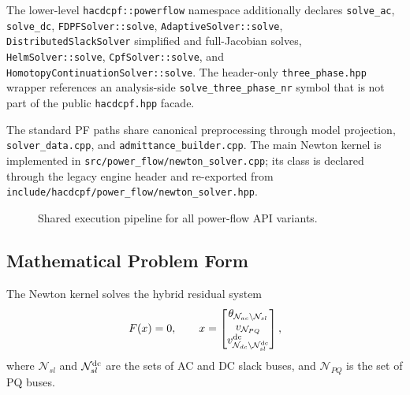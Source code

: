 The lower-level \texttt{hacdcpf::powerflow} namespace additionally declares
\texttt{solve\_ac}, \texttt{solve\_dc}, \texttt{FDPFSolver::solve},
\texttt{AdaptiveSolver::solve}, \texttt{DistributedSlackSolver} simplified and
full-Jacobian solves, \texttt{HelmSolver::solve}, \texttt{CpfSolver::solve},
and \texttt{HomotopyContinuationSolver::solve}.  The header-only
\texttt{three\_phase.hpp} wrapper references an analysis-side
\texttt{solve\_three\_phase\_nr} symbol that is not part of the public
\texttt{hacdcpf.hpp} facade.

The standard PF paths share canonical preprocessing through model projection,
\texttt{solver\_data.cpp}, and \texttt{admittance\_builder.cpp}.  The main Newton
kernel is implemented in \texttt{src/power\_flow/newton\_solver.cpp}; its class is
declared through the legacy engine header and re-exported from
\texttt{include/hacdcpf/power\_flow/newton\_solver.hpp}.

\begin{figure}[H]
\centering
{}
\caption{Shared execution pipeline for all power-flow API variants.}
\label{fig:pf-pipeline}
\end{figure}

\subsection{Mathematical Problem Form}

The Newton kernel solves the hybrid residual system
\begin{align}
F(x) = 0,
\qquad
x =
\begin{bmatrix}
\theta_{\mathcal{N}_{ac}\setminus\mathcal{N}_{sl}} \\
v_{\mathcal{N}_{PQ}} \\
v^{\mathrm{dc}}_{\mathcal{N}_{dc}\setminus\mathcal{N}_{sl}^{\mathrm{dc}}}
\end{bmatrix},
\label{eq:pf-residual}
\end{align}
where \(\mathcal{N}_{sl}\) and \(\mathcal{N}_{sl}^{\mathrm{dc}}\) are the sets of
AC and DC slack buses, and \(\mathcal{N}_{PQ}\) is the set of PQ buses.

